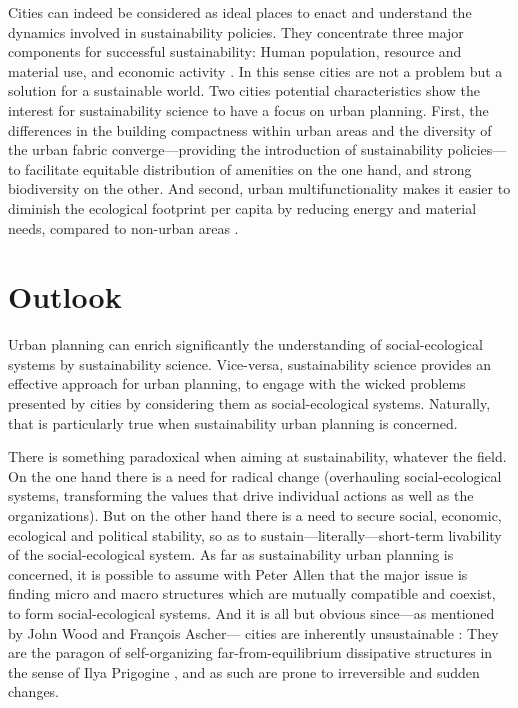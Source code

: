 \documentclass[10pt,a4paper]{article}
\begin{document}
\begin{multicols}{2}
Cities can indeed be considered as ideal places to enact and understand the dynamics involved in sustainability policies. They concentrate three major components for successful sustainability: Human population, resource and material use, and economic activity \citep{r135}. In this sense cities are not a problem but a solution for a sustainable world. Two cities potential characteristics show the interest for sustainability science to have a focus on urban planning. First, the differences in the building compactness within urban areas and the diversity of the urban fabric converge---providing the introduction of sustainability policies---to facilitate equitable distribution of amenities on the one hand, and strong biodiversity on the other. And second, urban multifunctionality makes it easier to diminish the ecological footprint per capita by reducing energy and material needs, compared to non-urban areas \citep{r110}.

\section{Outlook}
\noindent Urban planning can enrich significantly the understanding of social-ecological systems by sustainability science. Vice-versa, sustainability science provides an effective approach for urban planning, to engage with the wicked problems presented by cities by considering them as social-ecological systems. Naturally, that is particularly true when sustainability urban planning is concerned.

There is something paradoxical when aiming at sustainability, whatever the field. On the one hand there is a need for radical change (overhauling social-ecological systems, transforming the values that drive individual actions as well as the organizations). But on the other hand there is a need to secure social, economic, ecological and political stability, so as to sustain---literally---short-term livability of the social-ecological system. As far as sustainability urban planning is concerned, it is possible to assume with Peter Allen \citep{r137} that the major issue is finding micro and macro structures which are mutually compatible and coexist, to form social-ecological systems. And it is all but obvious since---as mentioned by John Wood and François Ascher--- cities are inherently unsustainable \citep{r138, r139}: They are the paragon of self-organizing far-from-equilibrium dissipative structures in the sense of Ilya Prigogine \citep{r140}, and as such are prone to irreversible and sudden changes.


\end{multicols}
\end{document}
